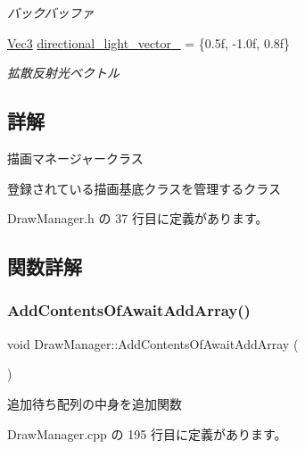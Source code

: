 \begin{DoxyCompactItemize}
\begin{DoxyCompactList}\small\item\em バックバッファ \end{DoxyCompactList}\item 
\mbox{\hyperlink{_vector3_d_8h_ab16f59e4393f29a01ec8b9bbbabbe65d}{Vec3}} \mbox{\hyperlink{class_draw_manager_a0ec52b1d65b765e4fe336d814c2bc11c}{directional\+\_\+light\+\_\+vector\+\_\+}} = \{0.\+5f, -\/1.\+0f, 0.\+8f\}
\begin{DoxyCompactList}\small\item\em 拡散反射光ベクトル \end{DoxyCompactList}\end{DoxyCompactItemize}


\subsection{詳解}
描画マネージャークラス 

登録されている描画基底クラスを管理するクラス 

 Draw\+Manager.\+h の 37 行目に定義があります。



\subsection{関数詳解}
\mbox{\label{class_draw_manager_a984cd9de288151fd1d170f80f93a11e8}} 
\subsubsection{\texorpdfstring{Add\+Contents\+Of\+Await\+Add\+Array()}{AddContentsOfAwaitAddArray()}}
{\footnotesize\ttfamily void Draw\+Manager\+::\+Add\+Contents\+Of\+Await\+Add\+Array (\begin{DoxyParamCaption}{ }\end{DoxyParamCaption})\hspace{0.3cm}{\ttfamily [private]}}



追加待ち配列の中身を追加関数 



 Draw\+Manager.\+cpp の 195 行目に定義があります。

